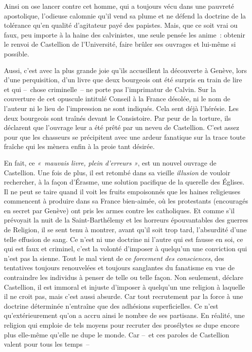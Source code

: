 \documentclass[french,twoside]{book} %
\begin{document}
\noindent Ainsi on ose lancer contre cet homme, qui a toujours vécu dans une pauvreté apostolique, l’odieuse calomnie qu’il vend sa plume et ne défend la doctrine de la tolérance qu’en qualité d’agitateur payé des papistes. Mais, que ce soit vrai ou faux, peu importe à la haine des calvinistes, une seule pensée les anime : obtenir le renvoi de Castellion de l’Université, faire brûler ses ouvrages et lui-même si possible.\par
Aussi, c’est avec la plus grande joie qu’ils accueillent la découverte à Genève, lors d’une perquisition, d’un livre que deux bourgeois ont été surpris en train de lire et qui – chose criminelle – ne porte pas l’imprimatur de Calvin. Sur la couverture de cet opuscule intitulé Conseil à la France désolée, ni le nom de l’auteur ni le lieu de l’impression ne sont indiqués. Cela sent déjà l’hérésie. Les deux bourgeois sont traînés devant le Consistoire. Par peur de la torture, ils déclarent que l’ouvrage leur a été prêté par un neveu de Castellion. C’est assez pour que les chasseurs se précipitent avec une ardeur fanatique sur la trace toute fraîche qui les mènera enfin à la proie tant désirée.\par
En fait, ce \emph{« mauvais livre, plein d’erreurs »}, est un nouvel ouvrage de Castellion. Une fois de plus, il est retombé dans sa vieille \emph{illusion} de vouloir rechercher, à la façon d’Érasme, une solution pacifique de la querelle des Églises. Il ne peut se taire quand il voit les fruits empoisonnés que les haines religieuses commencent à produire dans sa France bien-aimée, où les protestants (encouragés en secret par Genève) ont pris les armes contre les catholiques. Et comme s’il prévoyait la nuit de la Saint-Barthélemy et les horreurs épouvantables des guerres de Religion, il se sent tenu à montrer, avant qu’il soit trop tard, l’absurdité d’une telle effusion de sang. Ce n’est ni une doctrine ni l’autre qui est fausse en soi, ce qui est faux et criminel, c’est la volonté d’imposer à quelqu’un une conviction qui n’est pas la sienne. Tout le mal vient de ce \emph{forcement des consciences}, des tentatives toujours renouvelées et toujours sanglantes du fanatisme en vue de contraindre les individus à penser de telle ou telle façon. Non seulement, déclare Castellion, il est immoral et injuste d’imposer à quelqu’un une religion à laquelle il ne croit pas, mais c’est aussi absurde. Car tout recrutement par la force à une doctrine déterminée n’entraîne que des adhésions superficielles. Ce n’est qu’extérieurement qu’on a accru ainsi le nombre de ses partisans. En réalité, une religion qui emploie de tels moyens pour recruter des prosélytes se dupe encore plus elle-même qu’elle ne dupe le monde. Car – et ces paroles de Castellion valent pour tous les temps –\par
\end{document}
